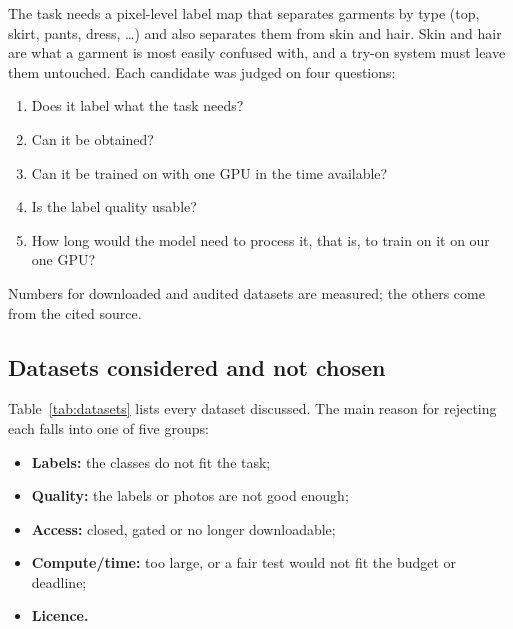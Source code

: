 \documentclass[conference,a4paper]{IEEEtran}
\begin{document}
The task needs a pixel-level label map that separates garments by type (top, skirt, pants, dress, \dots) and also separates them from skin and hair. Skin and hair are what a garment is most easily confused with, and a try-on system must leave them untouched. Each candidate was judged on four questions:
\begin{enumerate}
  \item Does it label what the task needs?
  \item Can it be obtained?
  \item Can it be trained on with one GPU in the time available?
  \item Is the label quality usable?
  \item How long would the model need to process it, that is, to train on it on our one GPU?
\end{enumerate}
Numbers for downloaded and audited datasets are measured; the others come from the cited source.

\subsection{Datasets considered and not chosen}
Table~\ref{tab:datasets} lists every dataset discussed. The main reason for rejecting each falls into one of five groups:
\begin{itemize}
  \item \textbf{Labels:} the classes do not fit the task;
  \item \textbf{Quality:} the labels or photos are not good enough;
  \item \textbf{Access:} closed, gated or no longer downloadable;
  \item \textbf{Compute/time:} too large, or a fair test would not fit the budget or deadline;
  \item \textbf{Licence.}
\end{itemize}
\end{document}
